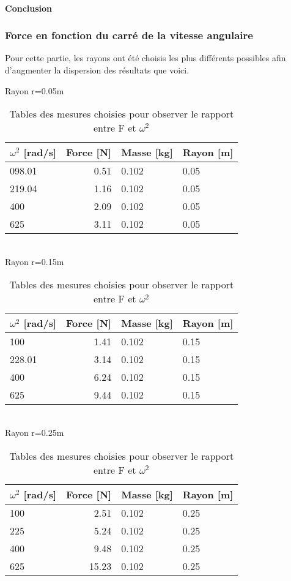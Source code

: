 \paragraph{Conclusion}

\newpage
\clearpage
\subsubsection{Force en fonction du carré de la vitesse angulaire}

Pour cette partie, les rayons ont été choisis les plus différents possibles afin d'augmenter la dispersion des résultats  que voici.

\begin{table}[ht]
    \caption[Tables mesures vitesse angulaire force]{Tables des mesures choisies pour observer le rapport entre F et $\omega^2$}
    \centering

    Rayon r=0.05m\\[1px]
    \begin{tabular}{|l|r|l|l|}
	\hline
	$\omega^2$ [rad/s] & Force [N] & Masse [kg] & Rayon [m]\\
	\hline
	098.01	&0.51	&0.102	&0.05\\
	219.04	&1.16	&0.102	&0.05\\
	400	&2.09	&0.102	&0.05\\
	625	&3.11	&0.102	&0.05\\
	\hline
    \end{tabular}\\[5px]

    Rayon r=0.15m\\[1px]
    \begin{tabular}{|l|r|l|l|}
	\hline
	$\omega^2$ [rad/s] & Force [N] & Masse [kg] & Rayon [m]\\
	\hline
	100	&1.41	&0.102	&0.15\\
	228.01	&3.14	&0.102	&0.15\\
	400	&6.24	&0.102	&0.15\\
	625	&9.44	&0.102	&0.15\\
	\hline
    \end{tabular}\\[5px]

    Rayon r=0.25m\\[1px]
    \begin{tabular}{|l|r|l|l|}
	\hline
	$\omega^2$ [rad/s] & Force [N] & Masse [kg] & Rayon [m]\\
	\hline
	100	&2.51	&0.102	&0.25\\
	225	&5.24	&0.102	&0.25\\
	400	&9.48	&0.102	&0.25\\
	625	&15.23	&0.102	&0.25\\
	\hline
    \end{tabular}
\end{table}

